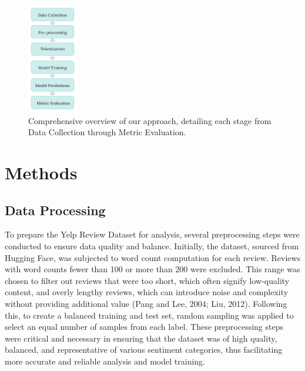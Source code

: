 \documentclass[12pt]{article}
\begin{document}
\begin{figure}[H]
  \centering
  \includegraphics[width=0.2\textwidth, height=0.3\textheight]{./methodology.jpg}
  \caption{Comprehensive overview of our approach, detailing each stage from Data Collection through Metric Evaluation.}
  \label{fig:example}
\end{figure}

\section{Methods}

\subsection{Data Processing}
To prepare the Yelp Review Dataset for analysis, several preprocessing steps were conducted to ensure data quality and balance. Initially, the dataset, sourced from Hugging Face, was subjected to word count computation for each review. Reviews with word counts fewer than 100 or more than 200 were excluded. This range was chosen to filter out reviews that were too short, which often signify low-quality content, and overly lengthy reviews, which can introduce noise and complexity without providing additional value (Pang and Lee, 2004; Liu, 2012). Following this, to create a balanced training and test set, random sampling was applied to select an equal number of samples from each label. These preprocessing steps were critical and necessary in ensuring that the dataset was of high quality, balanced, and representative of various sentiment categories, thus facilitating more accurate and reliable analysis and model training.
\end{document}
